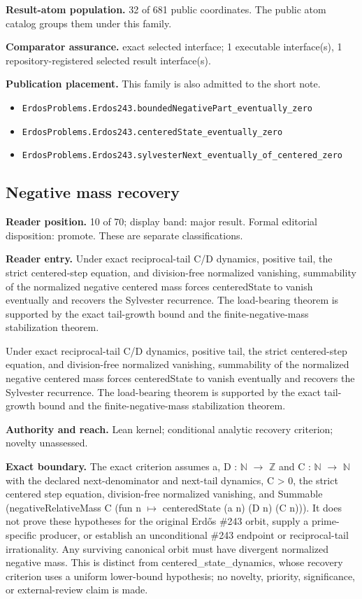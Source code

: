 \documentclass[11pt]{article}
\begin{document}
\textbf{Result-atom population.} 32 of 681 public coordinates. The public atom catalog groups them under this family.

\textbf{Comparator assurance.} exact selected interface; 1 executable interface(s), 1 repository-registered selected result interface(s).

\textbf{Publication placement.} This family is also admitted to the short note.

\begin{itemize}
  \item \nolinkurl{ErdosProblems.Erdos243.boundedNegativePart_eventually_zero}
  \item \nolinkurl{ErdosProblems.Erdos243.centeredState_eventually_zero}
  \item \nolinkurl{ErdosProblems.Erdos243.sylvesterNext_eventually_of_centered_zero}
\end{itemize}

\subsection{Negative mass recovery}
\textbf{Reader position.} 10 of 70; display band: major result.  Formal editorial disposition: promote.  These are separate classifications.

\textbf{Reader entry.} Under exact reciprocal-tail C/D dynamics, positive tail, the strict centered-step equation, and division-free normalized vanishing, summability of the normalized negative centered mass forces centeredState to vanish eventually and recovers the Sylvester recurrence. The load-bearing theorem is supported by the exact tail-growth bound and the finite-negative-mass stabilization theorem.

Under exact reciprocal-tail C/D dynamics, positive tail, the strict centered-step equation, and division-free normalized vanishing, summability of the normalized negative centered mass forces centeredState to vanish eventually and recovers the Sylvester recurrence. The load-bearing theorem is supported by the exact tail-growth bound and the finite-negative-mass stabilization theorem.

\textbf{Authority and reach.} Lean kernel; conditional analytic recovery criterion; novelty unassessed.

\textbf{Exact boundary.} The exact criterion assumes a, D : \ensuremath{\mathbb{N}} \ensuremath{\to} \ensuremath{\mathbb{Z}} and C : \ensuremath{\mathbb{N}} \ensuremath{\to} \ensuremath{\mathbb{N}} with the declared next-denominator and next-tail dynamics, C > 0, the strict centered step equation, division-free normalized vanishing, and Summable (negativeRelativeMass C (fun n \ensuremath{\mapsto} centeredState (a n) (D n) (C n))). It does not prove these hypotheses for the original Erdős \#243 orbit, supply a prime-specific producer, or establish an unconditional \#243 endpoint or reciprocal-tail irrationality. Any surviving canonical orbit must have divergent normalized negative mass. This is distinct from centered\_state\_dynamics, whose recovery criterion uses a uniform lower-bound hypothesis; no novelty, priority, significance, or external-review claim is made.
\end{document}
